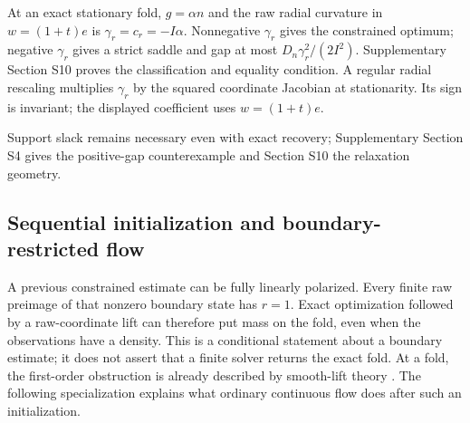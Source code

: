 \documentclass[10pt,a4paper]{article}
\begin{document}
At an exact stationary fold, $g=\alpha n$ and the raw radial curvature in $w=(1+t)e$ is $\gamma_r=c_r=-I\alpha$. Nonnegative $\gamma_r$ gives the constrained optimum; negative $\gamma_r$ gives a strict saddle and gap at most $D_n\gamma_r^2/(2I^2)$. Supplementary Section S10 proves the classification and equality condition. A regular radial rescaling multiplies $\gamma_r$ by the squared coordinate Jacobian at stationarity. Its sign is invariant; the displayed coefficient uses $w=(1+t)e$.

Support slack remains necessary even with exact recovery; Supplementary Section S4 gives the positive-gap counterexample and Section S10 the relaxation geometry.





\subsection{Sequential initialization and boundary-restricted flow}
\label{sec:sequential}
A previous constrained estimate can be fully linearly polarized. Every finite raw preimage of that nonzero boundary state has $r=1$. Exact optimization followed by a raw-coordinate lift can therefore put mass on the fold, even when the observations have a density. This is a conditional statement about a boundary estimate; it does not assert that a finite solver returns the exact fold. At a fold, the first-order obstruction is already described by smooth-lift theory \cite[Thm.~2.4]{lifts}. The following specialization explains what ordinary continuous flow does after such an initialization.
\end{document}
